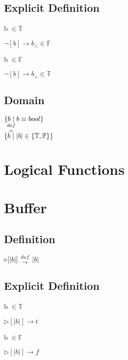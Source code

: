 \documentclass[11pt]{article}
\def \fdef{\hspace{1mm} {def \atop \rightarrow} \hspace{1mm}}
\def \feq{\hspace{1mm} {def \atop =} \hspace{1mm}}
\begin{document}
\subsection{Explicit Definition}
\vspace{2mm}
b $\in \mathbb{T}$
\begin{center}
$
\lnot[b] \rightarrow b_{\perp} \in \mathbb{F}
$
\end{center}
b $\in \mathbb{F}$
\begin{center}
$
\lnot[b] \rightarrow b_{\perp} \in \mathbb{T}
$
\end{center}
\subsection{Domain}
\begin{center}
$
\{ b \hspace{1mm}| \hspace{1mm} b \equiv bool\}
$
\\ \vspace{2mm}
$
\feq
$
\\ \vspace{2mm}
$
\{ b \hspace{1mm}| \hspace{1mm} |b| \in \{\mathbb{T}, \mathbb{F}\}\}
$
\end{center}



\section*{Logical Functions}

\section{Buffer}
\subsection{Definition}
\vspace{2mm}
\begin{center}
$
\triangleright[|b|] \fdef |b|
$
\end{center}
\subsection{Explicit Definition}
\vspace{2mm}
b $\in \mathbb{T}$
\begin{center}
$
\triangleright[|b|] \rightarrow t
$
\end{center}
b $\in \mathbb{F}$
\begin{center}
$
\triangleright[|b|] \rightarrow f
$
\end{center}
\end{document}
